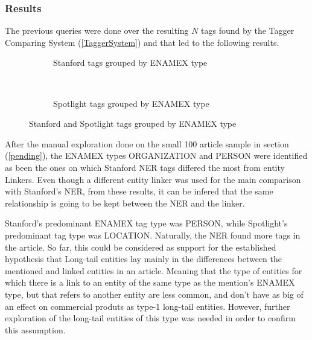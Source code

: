 \subsubsection{Results}
The previous queries were done over the resulting $N$ tags found by the Tagger Comparing System (\ref{TaggerSystem}) and that led to the following results.

\begin{figure*}[t!]
    \centering
    \begin{subfigure}[t]{0.5\textwidth}
        \label{fig:stanfordpertype}
        \centering
        \caption{Stanford tags grouped by ENAMEX type}
    \end{subfigure}%
    ~ 
    \begin{subfigure}[t]{0.5\textwidth}
        \label{fig:spotlightpertype}
        \centering
        \caption{Spotlight tags grouped by ENAMEX type}
    \end{subfigure}
    \caption{Stanford and Spotlight tags grouped by ENAMEX type}
\end{figure*}


After the manual exploration done on the small 100 article sample in section (\ref{pending}),
the ENAMEX types ORGANIZATION and PERSON were identified as been the ones on which Stanford NER tags differed the most from entity Linkers.
Even though a different entity linker was used for the main comparison with Stanford's NER, from these results,
it can be infered that the same relationship is going to be kept between the NER and the linker.

Stanford's predominant ENAMEX tag type was PERSON, while Spotlight's predominant tag type was LOCATION.
Naturally, the NER found more tags in the article.
So far, this could be considered as support for the established hypothesis that Long-tail entities lay mainly in the differences between 
the mentioned and linked entities in an article.
Meaning that the type of entities for which there is a link to an entity of the same type as the mention's ENAMEX type, but that refers to another entity
are less common, and don't have as big of an effect on commercial produts as type-1 long-tail entities.
However, further exploration of the long-tail entities of this type was needed in order to confirm this assumption.

